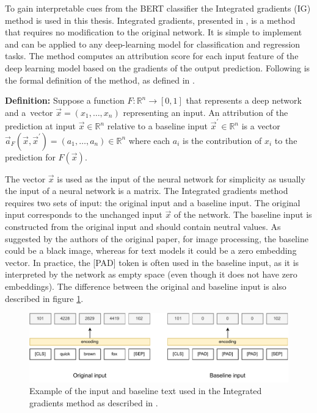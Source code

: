 To gain interpretable cues from the BERT classifier the Integrated gradients (IG) method is used in this thesis. Integrated gradients, presented in \cite{integ_grads}, is a method that requires no modification to the original network. It is simple to implement and can be applied to any deep-learning model for classification and regression tasks. The method computes an attribution score for each input feature of the deep learning model based on the gradients of the output prediction. Following is the formal definition of the method, as defined in \cite{integ_grads}.

\vspace{2mm}

\textbf{Definition:} Suppose a function $F: \mathbb{R}^n \rightarrow [0, 1]$ that represents a deep network and a~vector $\Vec{x} = (x_1, …, x_n)$ representing an input. An attribution of the prediction at input $\Vec{x} \in \mathbb{R}^n$ relative to a baseline input $\Vec{x}^{'} \in \mathbb{R}^n$ is a vector $\Vec{a}_F(\Vec{x}, \Vec{x}^{'}) = (a_1, …, a_n) \in \mathbb{R}^n$ where each $a_i$ is the contribution of $x_i$ to the prediction for $F(\Vec{x})$.

\vspace{2mm}

The vector $\Vec{x}$ is used as the input of the neural network for simplicity as usually the input of a neural network is a matrix. The Integrated gradients method requires two sets of input: the original input and a baseline input. The original input corresponds to the unchanged input $\Vec{x}$ of the network. The baseline input is constructed from the original input and should contain neutral values. As suggested by the authors of the original paper, for image processing, the baseline could be a black image, whereas for text models it could be a zero embedding vector. In practice, the [PAD] token is often used in the baseline input, as it is interpreted by the network as empty space (even though it does not have zero embeddings). The difference between the original and baseline input is also described in figure \ref{fig:integ_grads1}.

\begin{figure}[H]
    \centering
    \includegraphics[scale=0.8]{obrazky-figures/integ_grads1.pdf}
    \caption{Example of the input and baseline text used in the Integrated gradients method as described in \cite{integ_grads_towards}.}
    \label{fig:integ_grads1}
\end{figure}

